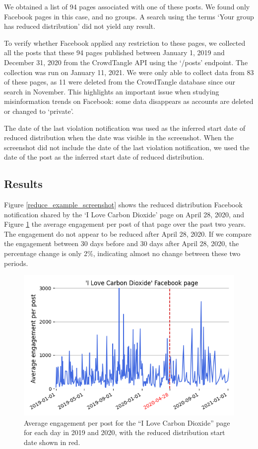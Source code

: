 \documentclass[11pt,a4paper]{article}
\begin{document}
We obtained a list of 94 pages associated with one of these posts. 
We found only Facebook pages in this case, and no groups. 
A search using the terms `Your group has reduced distribution' did not yield any result.

To verify whether Facebook applied any restriction to these pages, we collected all the posts that these 94 pages published between January 1, 2019 and December 31, 2020 from the CrowdTangle API using the `/posts' endpoint. 
The collection was run on January 11, 2021. 
We were only able to collect data from 83 of these pages, as 11 were deleted from the CrowdTangle database since our search in November. 
This highlights an important issue when studying misinformation trends on Facebook: some data disappears as accounts are deleted or changed to ‘private’.

The date of the last violation notification was used as the inferred start date of reduced distribution when the date was visible in the screenshot. 
When the screenshot did not include the date of the last violation notification, we used the date of the post as the inferred start date of reduced distribution. 

\subsection{Results}

Figure \ref{reduce_example_screenshot} shows the reduced distribution Facebook notification shared by the ‘I Love Carbon Dioxide’ page on April 28, 2020, and Figure \ref{reduce_example_timeseries} the average engagement per post of that page over the past two years. The engagement do not appear to be reduced after April 28, 2020. 
If we compare the engagement between 30 days before and 30 days after April 28, 2020, the percentage change is only 2\%, indicating almost no change between these two periods.

\begin{figure}[!h]
\centering
\includegraphics[width=\linewidth]{./../figure/reduce_example_timeseries.png}
\caption{Average engagement per post for the “I Love Carbon Dioxide” page for each day in 2019 and 2020, with the reduced distribution start date shown in red.}
\label{reduce_example_timeseries}
\end{figure}
\end{document}
